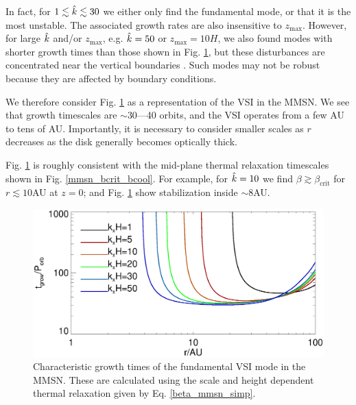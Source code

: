 In fact, for $1\lesssim \hat{k} \lesssim 30$ we either only find the
fundamental mode, or that it is the most unstable. The associated 
growth rates are also insensitive to $z_\mathrm{max}$. However, for
large $\hat{k}$ and/or $z_\mathrm{max}$, e.g. $\hat{k}=50$ or 
$z_\mathrm{max}=10H$, we also found modes with shorter growth times 
than those shown in Fig. \ref{mmsn_overall}, but these disturbances are 
concentrated near the vertical boundaries
\citep{nelson13,mcnally14}. Such modes may not be robust because    
they are affected by boundary conditions. %

We therefore consider Fig. \ref{mmsn_overall} as a representation of the
VSI in the MMSN. We see that growth timescales are $\sim
30$---40 orbits, and the VSI operates from a few AU to tens of
AU. Importantly, it is necessary to consider smaller scales as $r$
decreases as the disk generally becomes optically thick. 

Fig. \ref{mmsn_overall} is roughly consistent with the 
mid-plane thermal relaxation timescales shown in
Fig. \ref{mmsn_bcrit_bcool}. For example, for $\hat{k}=10$ we find 
$\beta \gtrsim \beta_\mathrm{crit}$ for $r\lesssim 10$AU at $z=0$; and
Fig. \ref{mmsn_overall} show stabilization inside $\sim 8$AU. 


\begin{figure}
  \includegraphics[width=\linewidth]{figures/eigen_compare_grow.ps}
  \caption{Characteristic growth times of the fundamental VSI mode in
    the MMSN. These are calculated using the scale and height
    dependent thermal relaxation given by Eq. \ref{beta_mmsn_simp}. 
    \label{mmsn_overall}}    
\end{figure}

